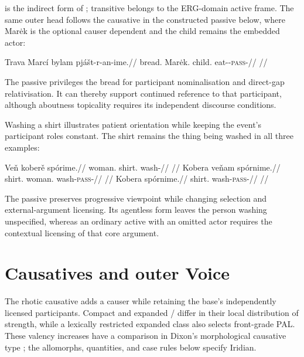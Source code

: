  is the indirect form of ; transitive 
belongs to the ERG-domain active frame. The same outer head follows the
causative in the constructed passive below, where Marėk is the optional causer
dependent and the child remains the embedded actor:

\ex
\begingl
\gla Trava Marcí bylam pjášt-r-an-ime.//
\glb bread.\Dir{} Marėk.\Ind{} child.\Ind{} eat-\Caus{}-\textsc{pass}-\Prog{}//
\glft {}//
\endgl
\xe

The passive privileges the bread for
participant nominalisation and direct-gap relativisation. It can thereby
support continued reference to that participant, although aboutness topicality
requires its independent discourse conditions.


Washing a shirt illustrates patient orientation while keeping the
event's participant roles constant. The shirt remains the thing being washed
in all three examples:

\pex\label{ex:val-slot-passive}
\a
\begingl
\gla Veň koberě spórime.//
\glb woman.\Dir{} shirt.\Ind{} wash-\Prog{}//
\glft {}
//
\endgl
\a
\begingl
\gla Kobera veňam spórnime.//
\glb shirt.\Dir{} woman.\Ind{} wash-\textsc{pass}-\Prog{}//
\glft {}
//
\endgl
\a
\begingl
\gla Kobera spórnime.//
\glb shirt.\Dir{} wash-\textsc{pass}-\Prog{}//
\glft {}
//
\endgl
\xe

The passive preserves progressive viewpoint while changing selection and
external-argument licensing. Its agentless form leaves the person washing
unspecified, whereas an ordinary active with an omitted actor requires the
contextual licensing of that core argument.

\section{Causatives and outer Voice}\label{sec:aspect-caus}

The rhotic causative adds a causer while retaining the base's independently
licensed participants. Compact  and expanded /
differ in their local distribution of strength, while a lexically restricted
expanded class also selects front-grade PAL. These valency increases have a
comparison in Dixon's morphological causative type \cite{dixon2000};
the allomorphs, quantities, and case rules below specify Iridian.

